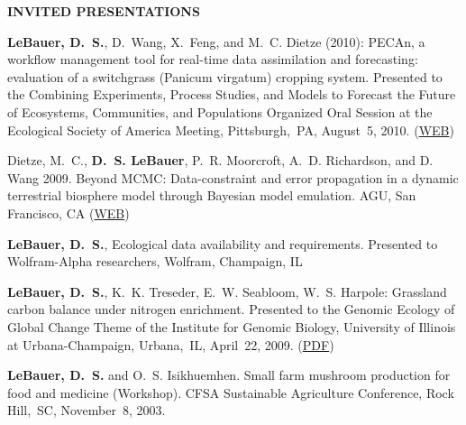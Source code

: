 \documentclass[12pt,twoside]{article}
\begin{document}
{\begin{itemize*}
\end{itemize*}
\textbf{INVITED PRESENTATIONS}
\begin{itemize*}

\item \textbf{LeBauer, D.~S.}, D.~Wang, X.~Feng, and M.~C. Dietze (2010):
PECAn, a workflow management tool for real-time data assimilation and forecasting: evaluation of a switchgrass (Panicum virgatum) cropping system.
Presented to the Combining Experiments, Process Studies, and Models to Forecast the Future of Ecosystems, Communities, and Populations Organized Oral Session at the Ecological Society of America Meeting,
Pittsburgh,~PA, August~5, 2010.
\ifpdf %
(\href{http://eco.confex.com/eco/2010/techprogram/S5662.HTM}{WEB})
\fi %
\item Dietze, M.~C., \textbf{D.~S. LeBauer}, P.~R. Moorcroft, A.~D. Richardson, and D. Wang 2009. Beyond MCMC: Data-constraint and error propagation in a dynamic terrestrial biosphere model through Bayesian model emulation. AGU, San Francisco, CA
\ifpdf %
(\href{http://adsabs.harvard.edu/abs/2009AGUFM.B44A..02D}{WEB})
\fi %
\item \textbf{LeBauer, D.~S.}, Ecological data availability and requirements. Presented to Wolfram-Alpha researchers, Wolfram, Champaign, IL
\item \textbf{LeBauer, D.~S.}, K.~K. Treseder, E.~W. Seabloom, W.~S. Harpole:
Grassland carbon balance under nitrogen enrichment.
Presented to the Genomic Ecology of Global Change Theme of the Institute for Genomic Biology, University of Illinois at Urbana-Champaign, 
Urbana,~IL, April~22, 2009.
\ifpdf %
(\href{http://dust.ess.uci.edu/smn/smn_snw_cgd_200711.pdf}{PDF})
\fi %
\item \textbf{LeBauer, D.~S.} and O.~S. Isikhuemhen. Small farm mushroom production for food and medicine (Workshop).
CFSA Sustainable Agriculture Conference, Rock Hill,~SC, November~8, 2003.
\end{itemize*}

}
\end{document}
